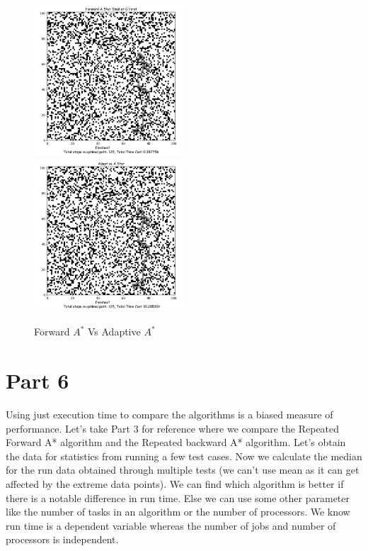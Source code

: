 \documentclass{article}
\begin{document}
\begin{figure}[h]
\includegraphics[width=0.5\textwidth, inner]{fsmg1}
\includegraphics[width=0.5\textwidth, right]{b}
\caption{Forward $A^*$ Vs Adaptive $A^*$}
\label{fig:figure2}
\end{figure}


\section*{Part 6}

Using just execution time to compare the algorithms is a biased measure of performance. Let’s take Part 3 for reference where we compare the Repeated Forward A* algorithm and the Repeated backward A* algorithm. Let’s obtain the data for statistics from running a few test cases. Now we calculate the median for the run data obtained through multiple tests (we can’t use mean as it can get affected by the extreme data points). We can find which algorithm is better if there is a notable difference in run time. Else we can use some other parameter like the number of tasks in an algorithm or the number of processors. We know run time is a dependent variable whereas the number of jobs and number of processors is independent.\\
\end{document}
